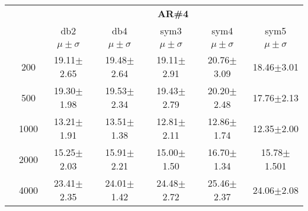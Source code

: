 \begin{table}[H]
\begin{tabular}{|c|c|c c c c c|}
\cline{3-7}
\multicolumn{2}{c|}{\multirow{3}{*}{}} & \multicolumn{5}{c|}{\textbf{AR\#4}}   \\\cline{3-7} 

\multicolumn{2}{c|}{}  & db2 & db4 & sym3 & sym4 & sym5 \\\cline{3-7}
\multicolumn{2}{c|}{}& $\mu \pm \sigma$ & $\mu \pm \sigma$ & $\mu \pm \sigma$ & $\mu \pm \sigma$ & $\mu \pm \sigma$ \\\hline

\multicolumn{1}{|c|}{ \multirow{5}{*}{\rotatebox[origin=c]{90}{\textbf{Neurônios}}} }
&200	&19.11$\pm$2.65	&19.48$\pm$2.64	&19.11$\pm$2.91	&20.76$\pm$3.09	&18.46$\pm$3.01\\\cline{2-7}
&500	&19.30$\pm$1.98	&19.53$\pm$2.34	&19.43$\pm$2.79	&20.20$\pm$2.48	&17.76$\pm$2.13\\\cline{2-7}
&1000	&13.21$\pm$1.91	&13.51$\pm$1.38	&12.81$\pm$2.11	&12.86$\pm$1.74	&12.35$\pm$2.00\\\cline{2-7}
&2000	&15.25$\pm$2.03	&15.91$\pm$2.21	&15.00$\pm$1.50	&16.70$\pm$1.34	&15.78$\pm$1.501\\\cline{2-7}
&4000	&23.41$\pm$2.35	&24.01$\pm$1.42	&24.48$\pm$2.72	&25.46$\pm$2.37	&24.06$\pm$2.08


\\\midrule
	\end{tabular}

\end{table} %

